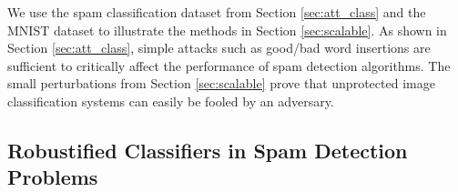We use the spam classification dataset from Section \ref{sec:att_class} 
and the MNIST dataset to illustrate the methods in Section \ref{sec:scalable}. As shown in Section \ref{sec:att_class}, simple attacks such as good/bad word insertions are sufficient to
critically affect the performance of spam detection algorithms. The small perturbations from Section \ref{sec:scalable} prove that unprotected image classification systems can easily be fooled by an adversary. 


\subsection{Robustified Classifiers in Spam Detection Problems}\label{sec:exp_scalable}

